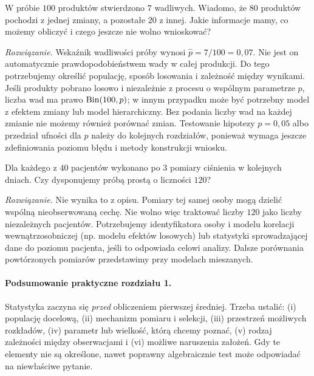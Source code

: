 \begin{zadanie}\label{zad:quality-case}
W próbie $100$ produktów stwierdzono $7$ wadliwych. Wiadomo, że $80$ produktów pochodzi z jednej zmiany, a pozostałe $20$ z innej. Jakie informacje mamy, co możemy obliczyć i czego jeszcze nie wolno wnioskować?
\par\emph{Rozwiązanie.} Wskaźnik wadliwości próby wynosi $\widehat p=7/100=0{,}07$. Nie jest on automatycznie prawdopodobieństwem wady w całej produkcji. Do tego potrzebujemy określić populację, sposób losowania i zależność między wynikami. Jeśli produkty pobrano losowo i niezależnie z procesu o wspólnym parametrze $p$, liczba wad ma prawo $\operatorname{Bin}(100,p)$; w innym przypadku może być potrzebny model z efektem zmiany lub model hierarchiczny. Bez podania liczby wad na każdej zmianie nie możemy również porównać zmian. Testowanie hipotezy $p=0{,}05$ albo przedział ufności dla $p$ należy do kolejnych rozdziałów, ponieważ wymaga jeszcze zdefiniowania poziomu błędu i metody konstrukcji wniosku.
\end{zadanie}

\begin{zadanie}
Dla każdego z $40$ pacjentów wykonano po $3$ pomiary ciśnienia w kolejnych dniach. Czy dysponujemy próbą prostą o liczności $120$?
\par\emph{Rozwiązanie.} Nie wynika to z opisu. Pomiary tej samej osoby mogą dzielić wspólną nieobserwowaną cechę. Nie wolno więc traktować liczby $120$ jako liczby niezależnych pacjentów. Potrzebujemy identyfikatora osoby i modelu korelacji wewnątrzosobniczej (np. modelu efektów losowych) lub statystyki sprowadzającej dane do poziomu pacjenta, jeśli to odpowiada celowi analizy. Dalsze porównania powtórzonych pomiarów przedstawimy przy modelach mieszanych.
\end{zadanie}

\paragraph{Podsumowanie praktyczne rozdziału 1.}
Statystyka zaczyna się \emph{przed} obliczeniem pierwszej średniej. Trzeba ustalić: (i) populację docelową, (ii) mechanizm pomiaru i selekcji, (iii) przestrzeń możliwych rozkładów, (iv) parametr lub wielkość, którą chcemy poznać, (v) rodzaj zależności między obserwacjami i (vi) możliwe naruszenia założeń. Gdy te elementy nie są określone, nawet poprawny algebraicznie test może odpowiadać na niewłaściwe pytanie.

